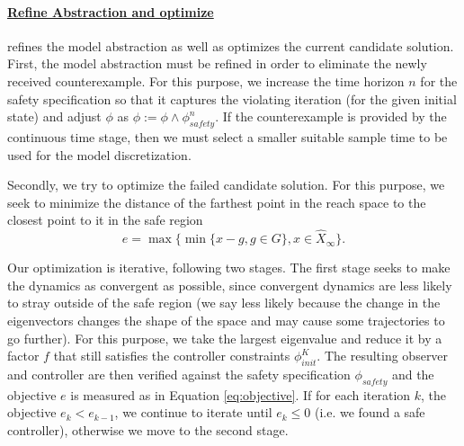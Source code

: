 \documentclass[sigconf]{llncs}
\renewcommand{\vec}[1]{{#1}}
\renewcommand{\note}[1]{\textcolor{red}{[#1]}}
\begin{document}
\paragraph{\underline{{\sc Refine Abstraction and optimize}}} refines the
model abstraction as well as optimizes the current candidate
solution.
%
First, the model abstraction must be refined in order to eliminate
the newly received counterexample. For this purpose,
we increase the time horizon $n$ for the
safety specification so that it captures the violating iteration
(for the given initial state) and adjust $\phi$ as 
$\phi := \phi \wedge \phi_\mathit{safety}^n$.
If the counterexample is provided by the {\sc continuous time} stage,
then we must select a smaller suitable sample time to be used
for the model discretization.


Secondly, we try to optimize the failed candidate solution.
For this purpose, we seek to minimize the distance of the farthest point in the
reach space to the closest point to it in the safe region
\begin{equation}
e = \max\{\min\{\vec{x}-\vec{g}, \vec{g}\in G\}, \vec{x} \in \hat{X}_\infty \}.
\label{eq:objective}
\end{equation}

Our optimization is iterative, following two stages.  The first stage
seeks to make the dynamics as convergent as possible, since convergent
dynamics are less likely to stray outside of the safe region (we say
less likely because the change in the eigenvectors changes the shape
of the space and may cause some trajectories to go further). For this
purpose, we take the largest eigenvalue and reduce it by a factor $f$
that still satisfies the controller constraints $\phi_\mathit{init}^{K}$.
The resulting observer and controller are then
verified against the safety specification $\phi_\mathit{safety}$ and the
objective $e$ is measured as in Equation \eqref{eq:objective}.   If for
each iteration $k$, the objective $e_k<e_{k-1}$, we continue to
iterate until $e_k \leq 0$ (i.e. we found a safe controller),
otherwise we move to the second stage.
\end{document}
